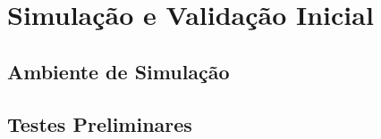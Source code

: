 
\section{Simulação e Validação Inicial}


\subsection{Ambiente de Simulação}


\subsection{Testes Preliminares}

